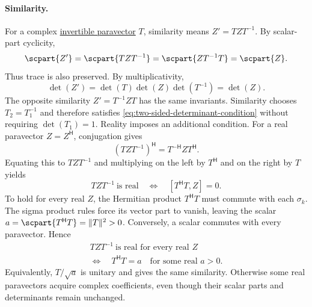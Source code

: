 \documentclass[11pt]{article}
\newcommand{\pv}[1]{{#1}}
\newcommand{\pvGreek}[1]{{#1}}
\newcommand{\pT}{\pv{T}}
\newcommand{\pZ}{\pv{Z}}
\newcommand{\pvsigma}{\pvGreek{\sigma}}
\numberwithin{equation}{section}
\begin{document}
\paragraph{Similarity.}
For a complex \hyperref[eq:unit-paravector]{invertible paravector} $\pT$,
similarity means $\pZ'=\pT \pZ \pT^{-1}$.
By scalar-part cyclicity,
\begin{equation*}
 \scpart{\pZ'}=\scpart{\pT \pZ \pT^{-1}}
 =\scpart{\pZ \pT^{-1}\pT}=\scpart {\pZ}.
\end{equation*}
Thus trace is also preserved.  By multiplicativity,
\begin{equation}
 \det(\pZ')=\det(\pT)\det(\pZ)\det(\pT^{-1})=\det(\pZ).
 \label{eq:det-similarity}
\end{equation}
The opposite similarity $\pZ'=\pT^{-1}\pZ \pT$ has the same invariants.
Similarity chooses $\pT_2=\pT_1^{-1}$ and therefore satisfies
\eqref{eq:two-sided-determinant-condition} without requiring
$\det(\pT_1)=1$. Reality imposes an additional condition.
For a real paravector $\pZ=\pZ^{\mathsf H}$, conjugation gives
\[
 (\pT\pZ\pT^{-1})^{\mathsf H}
 =\pT^{-\mathsf H}\pZ\pT^{\mathsf H}.
\]
Equating this to $\pT\pZ\pT^{-1}$ and multiplying on the left by
$\pT^{\mathsf H}$ and on the right by $\pT$ yields
\[
 \pT\pZ\pT^{-1}\ \text{is real}
 \quad\Longleftrightarrow\quad
 [\pT^{\mathsf H}\pT,\pZ]=0.
\]
To hold for every real $\pZ$, the Hermitian product
$\pT^{\mathsf H}\pT$ must commute with each $\pvsigma_k$.
The sigma product rules force its vector part to vanish, leaving
the scalar $a=\scpart{\pT^{\mathsf H}\pT}=\lVert\pT\rVert^2>0$.
Conversely, a scalar commutes with every paravector. Hence
\[
 \boxed{\begin{gathered}
 \pT\pZ\pT^{-1}\ \text{is real for every real }\pZ\\
 \Longleftrightarrow\quad \pT^{\mathsf H}\pT=a
 \quad\text{for some real }a>0.
 \end{gathered}}
\]
Equivalently, $\pT/\sqrt{a}$ is unitary and gives the same similarity.
Otherwise some real paravectors acquire complex coefficients, even
though their scalar parts and determinants remain unchanged.
\end{document}
